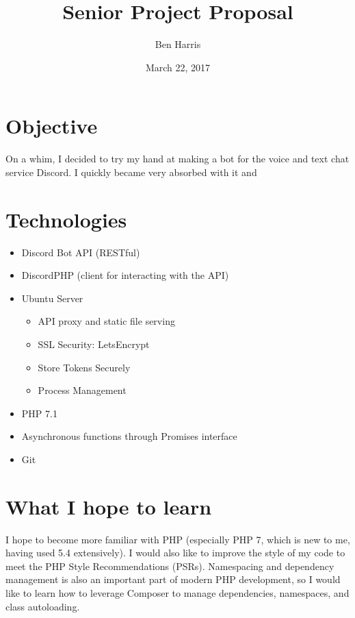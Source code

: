 \documentclass[11pt]{article}
\title{Senior Project Proposal}
\date{March 22, 2017}
\author{Ben Harris}
\begin{document}
    \maketitle

    \section{Objective}

        On a whim, I decided to try my hand at making a bot for the voice and text chat service Discord. I quickly became very absorbed with it and

    \section{Technologies}

        \begin{itemize}
            \item Discord Bot API (RESTful)
            \item DiscordPHP (client for interacting with the API)
            \item Ubuntu Server
                \begin{itemize}
                    \item API proxy and static file serving
                    \item SSL Security: LetsEncrypt
                    \item Store Tokens Securely
                    \item Process Management
                \end{itemize}
            \item PHP 7.1
            \item Asynchronous functions through Promises interface
            \item Git

        \end{itemize}




    \section{What I hope to learn}

        I hope to become more familiar with PHP (especially PHP 7, which is new to me, having used 5.4 extensively). I would also like to improve the style of my code to meet the PHP Style Recommendations (PSRs). Namespacing and dependency management is also an important part of modern PHP development, so I would like to learn how to leverage Composer to manage dependencies, namespaces, and class autoloading.
\end{document}
